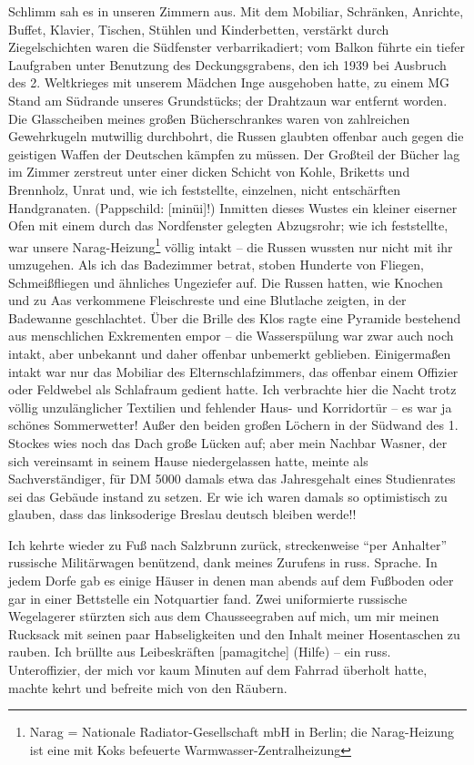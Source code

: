  Schlimm sah es in unseren Zimmern aus. Mit dem Mobiliar, Schränken, Anrichte, Buffet, Klavier, Tischen, Stühlen und Kinderbetten, verstärkt durch Ziegelschichten waren die Südfenster verbarrikadiert; vom Balkon führte ein tiefer Laufgraben unter Benutzung des Deckungsgrabens, den ich 1939 bei Ausbruch des 2. Weltkrieges mit unserem Mädchen Inge ausgehoben hatte, zu einem MG Stand am Südrande unseres Grundstücks; der Drahtzaun war entfernt worden. Die Glasscheiben meines großen Bücherschrankes waren von zahlreichen Gewehrkugeln mutwillig durchbohrt, die Russen glaubten offenbar auch gegen die geistigen Waffen der Deutschen kämpfen zu müssen. Der Großteil der Bücher lag im Zimmer zerstreut unter einer dicken Schicht von Kohle, Briketts und Brennholz, Unrat und, wie ich feststellte, einzelnen, nicht entschärften Handgranaten.  (Pappschild:  [minüi]!) Inmitten dieses Wustes ein kleiner eiserner Ofen mit einem durch das Nordfenster gelegten Abzugsrohr; wie ich feststellte, war unsere Narag-Heizung\footnote{Narag = Nationale Radiator-Gesellschaft mbH in Berlin; die Narag-Heizung ist eine mit Koks befeuerte Warmwasser-Zentralheizung} völlig intakt -- die Russen wussten nur nicht mit ihr umzugehen. Als ich das Badezimmer betrat, stoben Hunderte von Fliegen, Schmeißfliegen und ähnliches Ungeziefer auf. Die Russen hatten, wie Knochen und zu Aas verkommene Fleischreste und eine Blutlache zeigten, in der Badewanne geschlachtet. Über die Brille des Klos ragte eine Pyramide bestehend aus menschlichen Exkrementen empor -- die Wasserspülung war zwar auch noch intakt, aber unbekannt und daher offenbar unbemerkt geblieben. Einigermaßen intakt war nur das Mobiliar des Elternschlafzimmers, das offenbar einem Offizier oder Feldwebel als Schlafraum gedient hatte. Ich verbrachte hier die Nacht trotz völlig unzulänglicher Textilien und fehlender Haus- und Korridortür -- es war ja schönes Sommerwetter! Außer den beiden großen Löchern in der Südwand des 1. Stockes wies noch das Dach große Lücken auf; aber mein Nachbar Wasner, der sich  vereinsamt in seinem Hause niedergelassen hatte, meinte als Sachverständiger, für DM 5000 damals etwa das Jahresgehalt eines Studienrates sei das Gebäude instand zu setzen. Er wie ich waren damals so optimistisch zu glauben, dass das linksoderige Breslau deutsch bleiben werde!!

Ich kehrte wieder zu Fuß nach Salzbrunn zurück, streckenweise \enquote{per Anhalter} russische Militärwagen benützend, dank meines Zurufens in russ. Sprache. In jedem Dorfe gab es einige Häuser in denen man abends auf dem Fußboden oder gar in einer Bettstelle ein Notquartier fand. Zwei uniformierte russische Wegelagerer stürzten sich aus dem Chausseegraben auf mich, um mir meinen Rucksack mit seinen paar Habseligkeiten und den Inhalt meiner Hosentaschen zu rauben. Ich brüllte aus Leibeskräften  [pamagitche] (Hilfe) -- ein russ. Unteroffizier, der mich vor kaum Minuten auf dem Fahrrad überholt hatte, machte kehrt und befreite mich von den Räubern.

